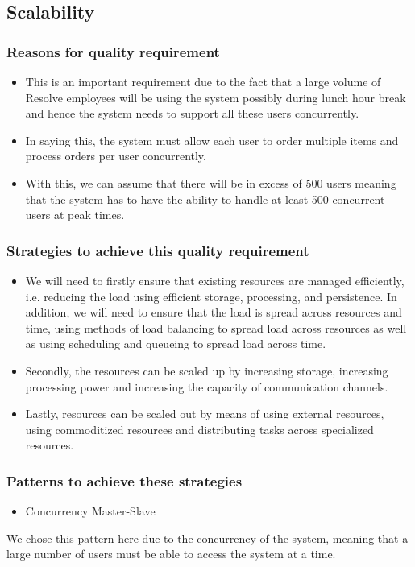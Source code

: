 \documentclass[a4paper,12pt]{article}
\begin{document}
\subsection{Scalability}
	\subsubsection{Reasons for quality requirement}
	\begin{itemize}
	\item This is an important requirement due to the fact that a large volume of Resolve employees will be using the system possibly during lunch hour break and hence the system needs to support all these users concurrently. 
	\item In saying this, the system must allow each user to order multiple items and process orders per user concurrently.
	\item With this, we can assume that there will be in excess of 500 users meaning that the system has to have the ability to handle at least 500 concurrent users at peak times.
	\end{itemize}
	\subsubsection{Strategies to achieve this quality requirement}
	\begin{itemize}
		\item We will need to firstly ensure that existing resources are managed efficiently, i.e. reducing the load using efficient storage, processing,  and persistence. In addition, we will need to ensure that the load is spread across resources and time, using methods of load balancing to spread load across resources as well as using scheduling and queueing to spread load across time.
		\item Secondly, the resources can be scaled up by increasing storage, increasing processing power and increasing the capacity of communication channels.
		\item Lastly, resources can be scaled out by means of using external resources, using commoditized resources and distributing tasks across specialized resources.
		\end{itemize}
	\subsubsection{Patterns to achieve these strategies}
	 \begin{itemize}
		\item Concurrency Master-Slave 
	\end{itemize}
We chose this pattern here due to the concurrency of the system, meaning that a large number of users must be able to access the system at a time.
\end{document}
